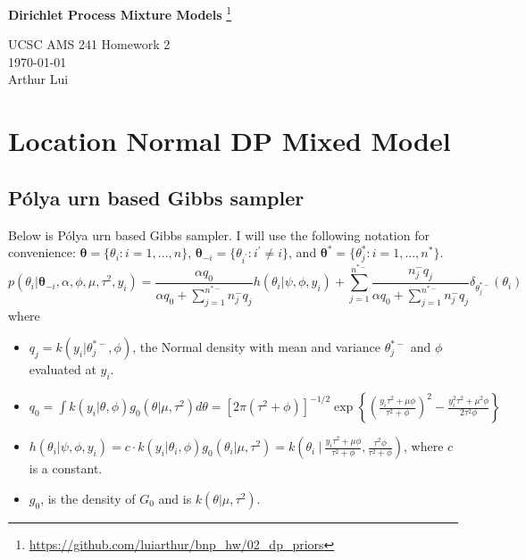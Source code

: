 \documentclass{article}
\def\wl{\par \vspace{\baselineskip}\noindent}
\def\ds{\displaystyle}
\def\tu{\textunderscore}
\def\hline{ \textcolor{lgrey}{\hrulefill} }
\newcommand{\m}[1]{\mathbf{\bm{#1}}} %
\def \ip{{i^\prime}}
\def \tmi{ \{ \theta_\ip : \ip \neq i\} }
\def \stmi{ \m{\theta}_{-i} }
\def \tv{ \{ \theta_i : i = 1,...,n\} }
\def \stv{ \m{\theta} }
\def \tu{ \{ \theta_j^* : i = 1,...,n^*\} }
\def \stu{ \m{\theta^*} }
\begin{document}
\begin{center}
  {\huge \textbf{Dirichlet Process Mixture Models}
    \footnote{\url{https://github.com/luiarthur/bnp_hw/02_dp_priors}}
  }\\
  \wl
  UCSC AMS 241 Homework 2\\
  \noindent\today\\
  Arthur Lui\\
  \hline
\end{center}

\section{Location Normal DP Mixed Model}

\subsection{P\'olya urn based Gibbs sampler}
\def\denom{ \alpha q_0 + \sum_{j=1}^{n^{*-}}n_j^- q_j }
Below is P\'olya urn based Gibbs sampler.
I will use the following notation for convenience: $\stv = \tv$, $\stmi = \tmi$, and $\stu = \tu$.
\[
    p(\theta_i | \stmi, \alpha, \phi, \mu, \tau^2, y_i) = 
    \ds\frac{\alpha q_0}{\denom} h(\theta_i| \psi, \phi, y_i) + 
    \ds\sum_{j=1}^{n^{*-}}\frac{ n_j^- q_j }{\denom} \delta_{\theta_j^{*-}}(\theta_i)
\]
where 
\begin{itemize}
  \item $q_j = k(y_i | \theta_j^{*-},\phi)$, the Normal density with mean and variance $\theta_j^{*-}$ and $\phi$ 
    evaluated at $y_i$.
  \item $q_0 = \ds\int k(y_i | \theta, \phi) g_0(\theta | \mu, \tau^2) d\theta
    = [2\pi(\tau^2+\phi)]^{-1/2} 
    \exp\left\{
      \ds \left( \frac{y_i\tau^2 + \mu\phi}{\tau^2+\phi} \right)^2 -
      \ds \frac{y_i^2\tau^2 + \mu^2\phi}{2 \tau^2 \phi}
    \right\}$
  \item $h(\theta_i| \psi, \phi, y_i) = c \cdot k(y_i | \theta_i, \phi) g_0(\theta_i | \mu, \tau^2)
    = k\left(\theta_i~\biggr|~\ds \frac{y_i\tau^2 + \mu\phi}{\tau^2+\phi},
    \ds\frac{\tau^2\phi}{\tau^2 + \phi} \right)$, where $c$ is a constant.
  \item $g_0$, is the density of $G_0$ and is $k(\theta | \mu, \tau^2)$.
\end{itemize}
\end{document}

